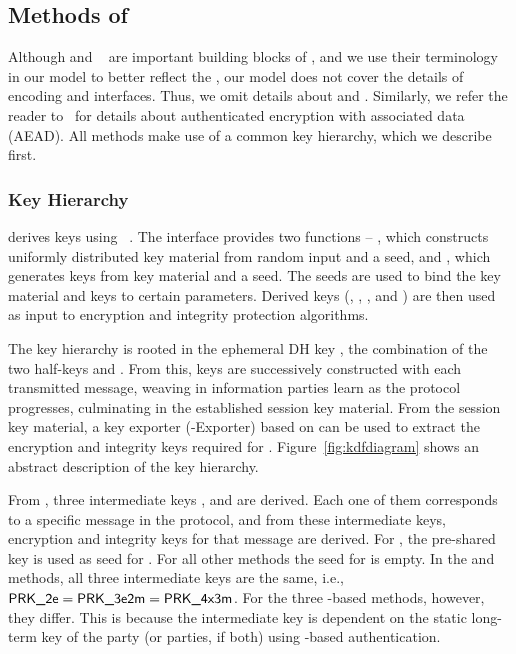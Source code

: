 \subsection{Methods of \mEdhoc{}}
\label{sec:methods}
Although \mCbor{} and \mCose{}~\cite{rfc8152} are important building blocks of
\mEdhoc{}, and we use their terminology in our \mTamarin{} model to better
reflect the \mSpec{}, our model does not cover the details of encoding and
\mCose{} interfaces.
%
Thus, we omit details about \mCbor{} and \mCose{}. Similarly, we refer the reader to~\cite{aead} for details about authenticated encryption with associated data (AEAD).
%
All methods make use of a common key hierarchy, which we describe first.
%

\subsubsection{Key Hierarchy}
\label{sec:keyHierarchy}
\mEdhoc{} derives keys using \mHkdf{}~\cite{rfc5869}.
%
The \mHkdf{} interface provides two functions -- \mHkdfExtract{}, which
constructs uniformly distributed key material from random input and a seed,
and \mHkdfExpand{}, which generates keys from key material and a seed.
%
The seeds are used to bind the key material and keys to certain parameters.
%
Derived keys (\mKtwoe, \mKtwom{}, \mKthreeae, and \mKthreem) are then used as
input to encryption and integrity protection algorithms.
%

The key hierarchy is rooted in the ephemeral DH key \mGxy{}, the combination
of the two half-keys \mGx{} and \mGy{}.
%
From this, keys are successively constructed with each transmitted message,
weaving in information parties learn as the protocol progresses, culminating
in the established session key material.
%
From the session key material, a key exporter (\mEdhoc-Exporter) based on
\mHkdf{} can be used to extract the encryption and integrity keys required
for \mOscore{}.
%
Figure~\ref{fig:kdfdiagram} shows an abstract description of the key hierarchy.
%

From \mGxy{}, three intermediate keys \mPRKtwo, \mPRKthree{} and
\mPRKthree{} are derived.
%
Each one of them corresponds to a specific message in the protocol, and from
these intermediate keys, encryption and integrity keys for that message are
derived.
%
For \mPskPsk{}, the pre-shared key is used as seed for \mPRKtwo.
%
For all other methods the seed for \mPRKtwo{} is empty.
%
In the \mPskPsk{} and \mSigSig{} methods, all three intermediate keys
are the same, i.e., $\textsf{PRK\_2e}{} = \textsf{PRK\_3e2m}{} = \textsf{PRK\_4x3m}$.
%
For the three \mStat-based methods, however, they differ.
%
This is because the intermediate key \mPRKthree{} is dependent on the static
long-term key of the party (or parties, if both) using \mStat{}-based
authentication.
%

